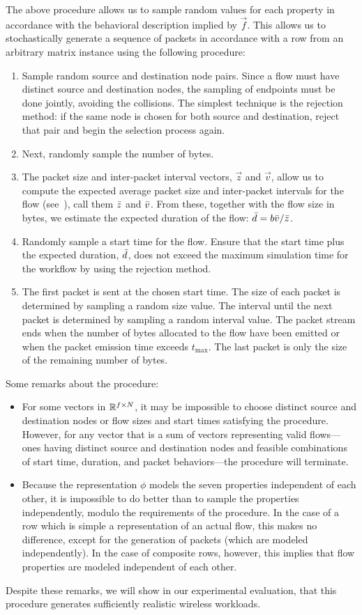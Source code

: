 \documentclass[twocolumn,final]{svjour3}
\begin{document}
The above procedure allows us to sample random values for each property in accordance with the behavioral description implied by $\vec{f}$.
This allows us to stochastically generate a sequence of packets in accordance with a row from an arbitrary  matrix instance using the following procedure:
\begin{enumerate}
\item Sample random source and destination node pairs.
Since a flow must have distinct source and destination nodes, the sampling of endpoints must be done jointly, avoiding the collisions.
The simplest technique is the rejection method:
if the same node is chosen for both source and destination, reject that pair and begin the selection process again.
\item Next, randomly sample the number of bytes.
\item The packet size and inter-packet interval vectors, $\vec{z}$ and $\vec{v}$, allow us to compute the expected average packet size and inter-packet intervals for the flow (see~), call them $\bar{z}$ and $\bar{v}$.
From these, together with the flow size in bytes, we estimate the expected duration of the flow:
$\bar{d} = {b\bar{v}/\bar{z}}$.
\item Randomly sample a start time for the flow. Ensure that the start time plus the expected duration, $\bar{d}$, does not exceed the maximum simulation time for the workflow by using the rejection method.
\item The first packet is sent at the chosen start time.
The size of each packet is determined by sampling a random size value.
The interval until the next packet is determined by sampling a random interval value.
The packet stream ends when the number of bytes allocated to the flow have been emitted or when the packet emission time exceeds $t_{\max}$.
The last packet is only the size of the remaining number of bytes.
\end{enumerate}
Some remarks about the procedure:
\begin{itemize}
\item For some vectors in $\mathbb{R}^{f \times N}$, it may be impossible to choose distinct source and destination nodes or flow sizes and start times satisfying the procedure.
However, for any vector that is a sum of vectors representing valid flows--- ones having distinct source and destination nodes and feasible combinations of start time, duration, and packet behaviors---the procedure will terminate.
\item Because the representation $\phi$ models the seven properties independent of each other, it is impossible to do better than to sample the properties independently, modulo the requirements of the procedure.
In the case of a row which is simple a representation of an actual flow, this makes no difference, except for the generation of packets (which are modeled independently).
In the case of composite rows, however, this implies that flow properties are modeled independent of each other.
\end{itemize}
Despite these remarks, we will show in our experimental evaluation, that this procedure generates sufficiently realistic wireless workloads.
\end{document}
